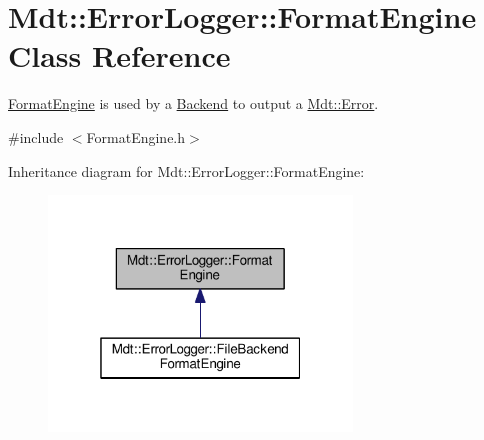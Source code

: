 \hypertarget{class_mdt_1_1_error_logger_1_1_format_engine}{}\section{Mdt\+:\+:Error\+Logger\+:\+:Format\+Engine Class Reference}
\label{class_mdt_1_1_error_logger_1_1_format_engine}


\hyperlink{class_mdt_1_1_error_logger_1_1_format_engine}{Format\+Engine} is used by a \hyperlink{class_mdt_1_1_error_logger_1_1_backend}{Backend} to output a \hyperlink{class_mdt_1_1_error}{Mdt\+::\+Error}.  




{\ttfamily \#include $<$Format\+Engine.\+h$>$}



Inheritance diagram for Mdt\+:\+:Error\+Logger\+:\+:Format\+Engine\+:\nopagebreak
\begin{figure}[H]
\begin{center}
\leavevmode
\includegraphics[width=229pt]{class_mdt_1_1_error_logger_1_1_format_engine__inherit__graph}
\end{center}
\end{figure}
